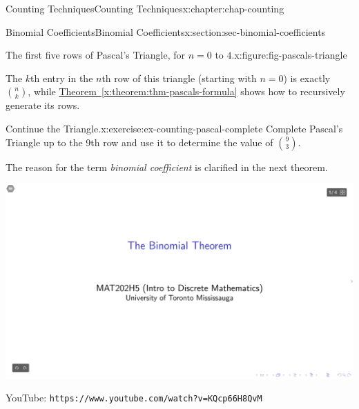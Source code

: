 \documentclass[oneside,10pt,]{book}
\newcommand{\xreffont}{\relax}
\newcommand{\mono}[1]{\texttt{#1}}
\numberwithin{equation}{section}
\newlength{\qrsize}
\newlength{\previewwidth}
\begin{document}
\begin{chapterptx}{Counting Techniques}{}{Counting Techniques}{}{}{x:chapter:chap-counting}
\begin{sectionptx}{Binomial Coefficients}{}{Binomial Coefficients}{}{}{x:section:sec-binomial-coefficients}
\begin{figureptx}{The first five rows of Pascal's Triangle, for \(n = 0\) to \(4\).}{x:figure:fig-pascals-triangle}{}
\begin{image}{0.3}{0.4}{0.3}
{\begin{tikzpicture}[scale=0.6]
\end{tikzpicture}
}%
\end{image}%
\tcblower
\end{figureptx}%
The \(k\)th entry in the \(n\)th row of this triangle (starting with \(n=0\)) is exactly \(\displaystyle\binom{n}{k}\), while \hyperref[x:theorem:thm-pascals-formula]{Theorem~{\xreffont\ref{x:theorem:thm-pascals-formula}}} shows how to recursively generate its rows.%
\begin{inlineexercise}{Continue the Triangle.}{x:exercise:ex-counting-pascal-complete}%
Complete Pascal's Triangle up to the 9th row and use it to determine the value of \(\displaystyle\binom{9}{3}\).%
\end{inlineexercise}
The reason for the term \emph{binomial coefficient} is clarified in the next theorem.%
\begin{sidebyside}{1}{0}{0}{0}%
\begin{sbspanel}{1}%
\setlength{\qrsize}{9em}
\setlength{\previewwidth}{\linewidth}
\addtolength{\previewwidth}{-\qrsize}
\begin{tcbraster}[raster columns=2, raster column skip=1pt, raster halign=center, raster force size=false, raster left skip=0pt, raster right skip=0pt]%
\begin{tcolorbox}[previewstyle, width=\previewwidth]%
\includegraphics[width=0.80\linewidth,height=\qrsize,keepaspectratio]{images/07-thumb.png}%
\end{tcolorbox}%
\begin{tcolorbox}[qrstyle]%
{\hypersetup{urlcolor=black}}%
\end{tcolorbox}%
\begin{tcolorbox}[captionstyle]%
\small YouTube: \mono{https://www.youtube.com/watch?v=KQcp66H8QvM}\end{tcolorbox}%

\end{tcbraster}
\end{sbspanel}
\end{sidebyside}
\end{sectionptx}
\end{chapterptx}
\end{document}
